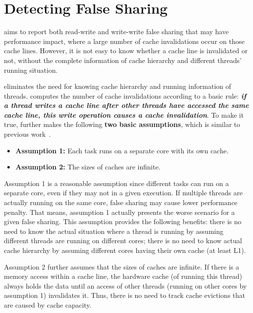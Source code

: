 \section{Detecting False Sharing}
\label{sec:basicidea}
\cheetah{} aims to report both read-write and write-write false sharing that may have performance impact, where a large number of cache invalidations occur on those cache lines. However, it is not easy to know whether a cache line is invalidated or not, without the complete information of cache hierarchy and different threads' running situation. 

\cheetah{} eliminates the need for knowing cache hierarchy and running information of threads. \cheetah{} computes the number of cache invalidations according to a basic rule: {\it \bf if a thread writes a cache line after other threads have accessed the same cache line, this write operation causes a cache invalidation}. To make it true, \cheetah{} further makes the following \textbf{two basic assumptions}, which is similar to previous work~\cite{qinzhao, Predator}.

\begin{itemize} 
\item {\bf Assumption 1:} Each task runs on a separate core with its own cache. 

\item {\bf Assumption 2: } The sizes of caches are infinite. 
 
\end{itemize}

Assumption 1 is a reasonable assumption since different tasks can run on a separate core, even if they may not in a given execution.  If multiple threads are actually running on the same core, false sharing may cause lower performance penalty. That means, assumption 1 actually presents the worse scenario for a given false sharing. This assumption provides the following benefits: there is no need to know the actual situation where a thread is running by assuming different threads are running on different cores; there is no need to know actual cache hierarchy by assuming different cores having their own cache (at least L1). 

Assumption 2 further assumes that the sizes of caches are infinite. If there is a memory access within a cache line, the hardware cache (of running this thread) always holds the data until an access of other threads (running on other cores by assumption 1) invalidates it. Thus, there is no need to track cache evictions that are caused by cache capacity. 

